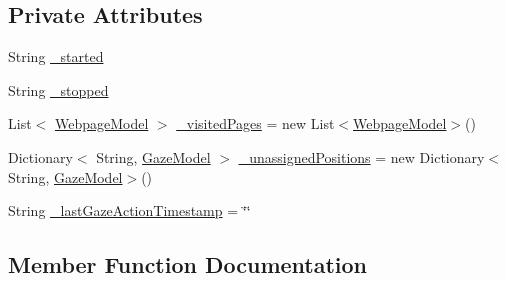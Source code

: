 \subsection*{Private Attributes}
\begin{DoxyCompactItemize}
\item 
String \hyperlink{class_web_analyzer_1_1_models_1_1_data_model_1_1_test_model_a81e009853a2999fac79631cfcd0ed4db}{\+\_\+started}
\item 
String \hyperlink{class_web_analyzer_1_1_models_1_1_data_model_1_1_test_model_a6253cabd7bb33c13da5927853cc8d228}{\+\_\+stopped}
\item 
List$<$ \hyperlink{class_web_analyzer_1_1_models_1_1_data_model_1_1_webpage_model}{Webpage\+Model} $>$ \hyperlink{class_web_analyzer_1_1_models_1_1_data_model_1_1_test_model_a849d23a83d37ac0e965c3946d8085aa2}{\+\_\+visited\+Pages} = new List$<$\hyperlink{class_web_analyzer_1_1_models_1_1_data_model_1_1_webpage_model}{Webpage\+Model}$>$()
\item 
Dictionary$<$ String, \hyperlink{class_web_analyzer_1_1_models_1_1_data_model_1_1_gaze_model}{Gaze\+Model} $>$ \hyperlink{class_web_analyzer_1_1_models_1_1_data_model_1_1_test_model_a1eaf774e73692913671ff3cb85f5772e}{\+\_\+unassigned\+Positions} = new Dictionary$<$String, \hyperlink{class_web_analyzer_1_1_models_1_1_data_model_1_1_gaze_model}{Gaze\+Model}$>$()
\item 
String \hyperlink{class_web_analyzer_1_1_models_1_1_data_model_1_1_test_model_a9969004441000c661fe533b8d954ec54}{\+\_\+last\+Gaze\+Action\+Timestamp} = \char`\"{}\char`\"{}
\end{DoxyCompactItemize}


\subsection{Member Function Documentation}
\hypertarget{class_web_analyzer_1_1_models_1_1_data_model_1_1_test_model_adf086c022e7d9475f2e705665af0721a}{}
